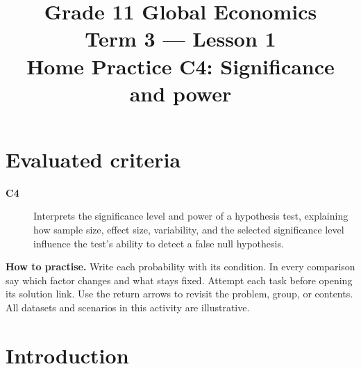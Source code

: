 \makeatletter
{}
\makeatother


\newcommand{\Pop}[1]{\HighlightStroke{GTenHLParameter}{#1}}
\newcommand{\Obs}[1]{\HighlightStroke{GTenHLValue}{#1}}
\newcommand{\Design}[1]{\HighlightStroke{GTenHLThird}{#1}}
\newcommand{\Result}[1]{\HighlightStroke{GTenHLOutcome}{#1}}

\title{Grade 11 Global Economics\\Term 3 --- Lesson 1\\Home Practice C4: Significance and power}
\author{}\date{}

\maketitle
\setcounter{tocdepth}{1}
\setcounter{secnumdepth}{2}
\label{toc}
\tableofcontents
\section*{Evaluated criteria}
\begin{description}
\item[\textbf{C4}] Interprets the significance level and power of a hypothesis test, explaining how sample size, effect size, variability, and the selected significance level influence the test’s ability to detect a false null hypothesis.
\end{description}
\textbf{How to practise.} Write each probability with its condition. In every comparison say which factor changes and what stays fixed. Attempt each task before opening its solution link. Use the return arrows to revisit the problem, group, or contents. All datasets and scenarios in this activity are illustrative.
\clearpage
\section{Introduction}\label{sec:introduction}
